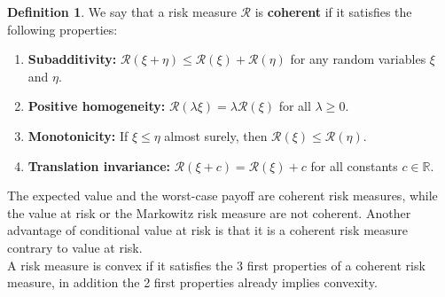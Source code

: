 \documentclass[12pt, openany]{report}
\newcommand{\R}{\mathbb{R}}
\theoremstyle{definition}
\newtheorem{definition}[thm]{Definition}
\begin{document}
\begin{definition}
    We say that a risk measure $\mathcal{R}$ is \textbf{coherent} if it satisfies the following properties:
    \begin{enumerate}
        \item \textbf{Subadditivity:} $\mathcal{R}(\xi + \eta) \leq \mathcal{R}(\xi) + \mathcal{R}(\eta)$ for any random variables $\xi$ and $\eta$.
        \item \textbf{Positive homogeneity:} $\mathcal{R}(\lambda \xi) = \lambda \mathcal{R}(\xi)$ for all $\lambda \geq 0$.
        \item \textbf{Monotonicity:} If $\xi \leq \eta$ almost surely, then $\mathcal{R}(\xi) \leq \mathcal{R}(\eta)$.
        \item \textbf{Translation invariance:} $\mathcal{R}(\xi + c) = \mathcal{R}(\xi) + c$ for all constants $c \in \R$.
    \end{enumerate}
\end{definition}
The expected value and the worst-case payoff are coherent risk measures, while the value at risk or the Markowitz risk measure are not coherent. Another advantage of conditional value at risk is that it is a coherent risk measure contrary to value at risk.\\
A risk measure is convex if it satisfies the 3 first properties of a coherent risk measure, in addition the 2 first properties already implies convexity.\\
\end{document}
